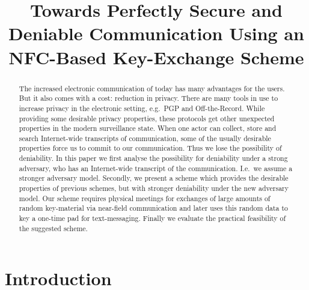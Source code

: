 \title{%
  Towards Perfectly Secure and Deniable Communication Using an NFC-Based 
  Key-Exchange Scheme
}

\maketitle
\begin{abstract}
  The increased electronic communication of today has many advantages for the 
  users.
  But it also comes with a cost: reduction in privacy.
  There are many tools in use to increase privacy in the electronic setting, 
  e.g.~PGP and Off-the-Record.
  While providing some desirable privacy properties, these protocols get other 
  unexpected properties in the modern surveillance state.
  When one actor can collect, store and search Internet-wide transcripts of 
  communication, some of the usually desirable properties force us to commit to 
  our communication.
  Thus we lose the possibility of deniability.
  In this paper we first analyse the possibility for deniability under a strong 
  adversary, who has an Internet-wide transcript of the communication.
  I.e.~we assume a stronger adversary model.
  Secondly, we present a scheme which provides the desirable properties of 
  previous schemes, but with stronger deniability under the new adversary 
  model.
  Our scheme requires physical meetings for exchanges of large amounts of 
  random key-material via near-field communication and later uses this random 
  data to key a one-time pad for text-messaging.
  Finally we evaluate the practical feasibility of the suggested scheme.

\end{abstract}

\acresetall{}
\section{Introduction}

